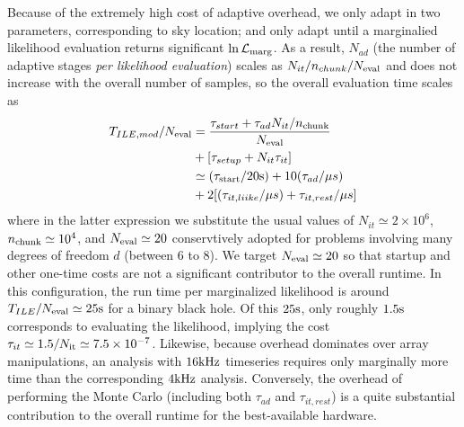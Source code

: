\documentclass[twocolumn,prd,nofootinbib]{revtex4}
\newcommand\unit[1]{{\rm #1}}
\begin{document}
Because of the extremely high cost of adaptive overhead, we only adapt in two parameters, corresponding to sky location; 
and only adapt until a marginalied likelihood evaluation  returns significant $\ln {\cal L}_{\rm marg}$.  As a result, $N_{ad}$
(the number of adaptive stages \emph{per likelihood evaluation}) scales as $N_{it}/n_{chunk}/N_{\rm eval}$ and does not
increase with the overall number of samples, so the overall evaluation time scales as
\begin{align}
T_{ILE,mod}/N_{\rm eval} &= \frac{\tau_{start} + \tau_{ad}N_{it}/n_{\rm chunk}}{N_{\rm eval}} 
 \nonumber \\ &
 + 
 [ \tau_{setup}  + N_{it}\tau_{it}
 ]  \\
& \simeq (\tau_{\rm start}/20\unit{s}) +  10 (\tau_{ad}/\mu s) 
 \nonumber \\ &
+ 2  [(\tau_{it,liike}/\mu s) + \tau_{it,rest}/\mu s]
\end{align}
where in the latter expression we substitute the usual values of $N_{it} \simeq 2\times 10^6$,  $n_{\rm chunk}\simeq
10^4$, and $N_{\rm eval}\simeq 20$ conservtively adopted
for problems involving many degrees of freedom $d$ (between 6 to 8).  We target $N_{\rm eval} \simeq 20$ so that startup and other one-time costs  are not a significant contributor to the overall
runtime.   In this configuration, the run time per marginalized likelihood is around $T_{ILE}/N_{\rm eval} \simeq 25
\unit{s}$ for a binary black hole.    Of this $25 \unit{s}$, only roughly
$1.5\unit{s}$ corresponds to evaluating the likelihood, implying the cost $\tau_{it} \simeq 1.5/N_{\rm it} \simeq
7.5\times 10^{-7}$.
Likewise, because overhead dominates over array manipulations, an analysis with  $16\unit{kHz}$ timeseries requires only
marginally more time than the corresponding $4\unit{kHz}$ analysis.
%
Conversely, the overhead of  performing the Monte Carlo (including both $\tau_{ad}$ and $\tau_{it,rest}$) is a quite substantial contribution to the overall runtime for the best-available hardware.
\end{document}

